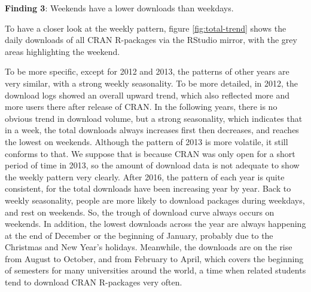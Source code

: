 \documentclass[
]{book}
\newenvironment{discovery}[1]{%
  \begin{tcolorbox}[colback=blue!30,colframe=blue!80!black]#1}{\end{tcolorbox}}
\begin{document}
\begin{discovery}
\textbf{Finding 3}: Weekends have a lower downloads than weekdays.
\end{discovery}

To have a closer look at the weekly pattern, figure \ref{fig:total-trend} shows the daily downloads of all CRAN R-packages via the RStudio mirror, with the grey areas highlighting the weekend.

To be more specific, except for 2012 and 2013, the patterns of other years are very similar, with a strong weekly seasonality. To be more detailed, in 2012, the download logs showed an overall upward trend, which also reflected more and more users there after release of CRAN. In the following years, there is no obvious trend in download volume, but a strong seasonality, which indicates that in a week, the total downloads always increases first then decreases, and reaches the lowest on weekends. Although the pattern of 2013 is more volatile, it still conforms to that. We suppose that is because CRAN was only open for a short period of time in 2013, so the amount of download data is not adequate to show the weekly pattern very clearly. After 2016, the pattern of each year is quite consistent, for the total downloads have been increasing year by year. Back to weekly seasonality, people are more likely to download packages during weekdays, and rest on weekends. So, the trough of download curve always occurs on weekends. In addition, the lowest downloads across the year are always happening at the end of December or the beginning of January, probably due to the Christmas and New Year's holidays. Meanwhile, the downloads are on the rise from August to October, and from February to April, which covers the beginning of semesters for many universities around the world, a time when related students tend to download CRAN R-packages very often.
\end{document}
